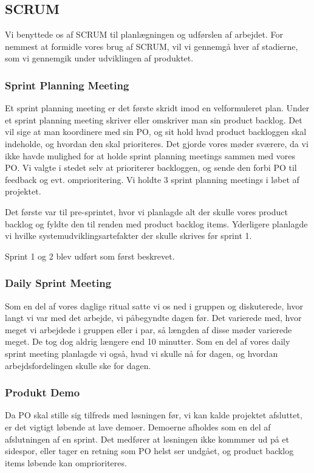 \subsection{SCRUM}
Vi benyttede os af SCRUM til planlægningen og udførslen af arbejdet.
For nemmest at formidle vores brug af SCRUM, vil vi gennemgå hver af stadierne, som vi gennemgik under udviklingen af produktet. 

\subsubsection{Sprint Planning Meeting}
Et sprint planning meeting er det første skridt imod en velformuleret plan.
Under et sprint planning meeting skriver eller omskriver man sin product backlog.
Det vil sige at man koordinere med sin PO, og sit hold hvad product backloggen skal indeholde, og hvordan den skal prioriteres.
Det gjorde vores møder sværere, da vi ikke havde mulighed for at holde sprint planning meetings sammen med vores PO.
Vi valgte i stedet selv at prioriterer backloggen, og sende den forbi PO til feedback og evt. omprioritering.
Vi holdte 3 sprint planning meetings i løbet af projektet.\cite{scrum} 

Det første var til pre-sprintet, hvor vi planlagde alt der skulle vores product backlog og fyldte den til renden med product backlog items.
Yderligere planlagde vi hvilke systemudviklingsartefakter der skulle skrives før sprint 1.

Sprint 1 og 2 blev udført som først beskrevet.

\subsubsection{Daily Sprint Meeting}
Som en del af vores daglige ritual satte vi os ned i gruppen og diskuterede, hvor langt vi var med det arbejde, vi påbegyndte dagen før.
Det varierede med, hvor meget vi arbejdede i gruppen eller i par, så længden af disse møder varierede meget.
De tog dog aldrig længere end 10 minutter.
Som en del af vores daily sprint meeting planlagde vi også, hvad vi skulle nå for dagen, og hvordan arbejdsfordelingen skulle ske for dagen.

\subsubsection{Produkt Demo}
Da PO skal stille sig tilfreds med løsningen før, vi kan kalde projektet afsluttet, er det vigtigt løbende at lave demoer.\cite{scrumdemo}
Demoerne afholdes som en del af afslutningen af en sprint.
Det medfører at løsningen ikke kommmer ud på et sidespor, eller tager en retning som PO helst ser undgået, og product backlog items løbende kan omprioriteres.

